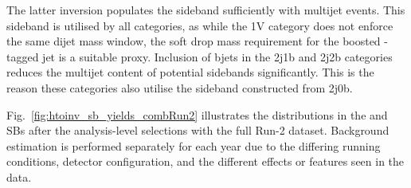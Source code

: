 \medskip

\noindent{}The latter inversion populates the sideband sufficiently with multijet events. This sideband is utilised by all \VH categories, as while the 1V category does not enforce the same dijet mass window, the soft drop mass requirement for the boosted \PVec-tagged \gls{jet} is a suitable proxy. Inclusion of \glspl{bjet} in the 2j1b and 2j2b categories reduces the multijet content of potential sidebands significantly. This is the reason these categories also utilise the sideband constructed from 2j0b.

Fig.~\ref{fig:htoinv_sb_yields_combRun2} illustrates the \ptmiss distributions in the \ttH and \VH \glspl{SB} after the analysis-level selections with the full Run-2 dataset. Background estimation is performed separately for each year due to the differing running conditions, detector configuration, and the different effects or features seen in the data.

